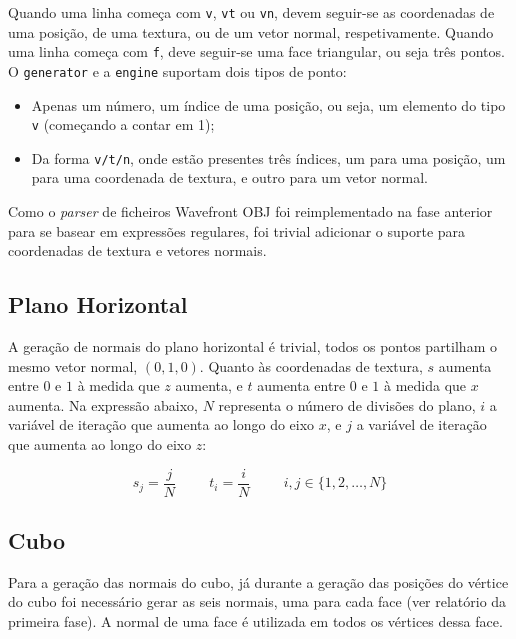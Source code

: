 \documentclass[12pt, a4paper]{article}
\begin{document}
Quando uma linha começa com \texttt{v}, \texttt{vt} ou \texttt{vn}, devem seguir-se as coordenadas
de uma posição, de uma textura, ou de um vetor normal, respetivamente. Quando uma linha começa com
\texttt{f}, deve seguir-se uma face triangular, ou seja três pontos. O \texttt{generator} e a
\texttt{engine} suportam dois tipos de ponto:

\begin{itemize}
    \item Apenas um número, um índice de uma posição, ou seja, um elemento do tipo \texttt{v}
        (começando a contar em 1);
    \item Da forma \texttt{v/t/n}, onde estão presentes três índices, um para uma posição, um para
        uma coordenada de textura, e outro para um vetor normal.
\end{itemize}

Como o \emph{parser} de ficheiros Wavefront OBJ foi reimplementado na fase anterior para se basear
em expressões regulares, foi trivial adicionar o suporte para coordenadas de textura e vetores
normais.

\subsection{Plano Horizontal}

A geração de normais do plano horizontal é trivial, todos os pontos partilham o mesmo vetor normal,
$(0, 1, 0)$. Quanto às coordenadas de textura, $s$ aumenta entre $0$ e $1$ à medida que $z$ aumenta,
e $t$ aumenta entre $0$ e $1$ à medida que $x$ aumenta. Na expressão abaixo, $N$ representa o número
de divisões do plano, $i$ a variável de iteração que aumenta ao longo do eixo $x$, e $j$ a variável
de iteração que aumenta ao longo do eixo $z$:

$$
s_j = \frac{j}{N}
\hspace{1cm}
t_i = \frac{i}{N}
\hspace{1cm}
i, j \in \lbrace 1, 2, \ldots, N \rbrace
$$

\subsection{Cubo}

Para a geração das normais do cubo, já durante a geração das posições do vértice do cubo foi
necessário gerar as seis normais, uma para cada face (ver relatório da primeira fase). A normal de
uma face é utilizada em todos os vértices dessa face.
\end{document}

